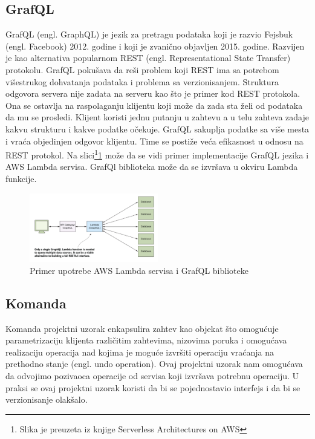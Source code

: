 \documentclass[12pt,oneside]{memoir}
\begin{document}
\subsection{GrafQL}

GrafQL (engl. GraphQL) je jezik za pretragu podataka koji je razvio Fejsbuk (engl. Facebook) 2012. godine i koji je zvanično objavljen 2015. godine\cite{gql}. Razvijen je kao alternativa popularnom REST (engl. Representational State Transfer) protokolu. GrafQL pokušava da reši problem koji REST ima sa potrebom višestrukog dohvatanja podataka i problema sa verzionisanjem. Struktura odgovora servera nije zadata na serveru kao što je primer kod REST protokola. Ona se ostavlja na raspolaganju klijentu koji može da zada sta želi od podataka da mu se prosledi. Klijent koristi jednu putanju u zahtevu a u telu zahteva zadaje kakvu strukturu i kakve podatke očekuje. GrafQL sakuplja podatke sa više mesta i vraća objedinjen odgovor klijentu. Time se postiže veća efikasnost u odnosu na REST protokol. Na slici\footnote{Slika je preuzeta iz knjige Serverless Architectures on AWS}\ref{fig:graphql} može da se vidi primer implementacije GrafQL jezika i AWS Lambda servisa. GrafQl biblioteka može da se izvršava u okviru Lambda funkcije. 

\begin{figure}[!ht]
  \centering
  \includegraphics[width=0.5\textwidth]{Slika 11.png}
  \caption{Primer upotrebe AWS Lambda servisa i GrafQL biblioteke}
  \label{fig:graphql}
\end{figure}

\subsection{Komanda}
Komanda projektni uzorak enkapsulira zahtev kao objekat što omogućuje parametrizaciju klijenta različitim zahtevima, nizovima poruka i omogućava realizaciju operacija nad kojima je moguće izvršiti operaciju vraćanja na prethodno stanje (engl. undo operation)\cite{cdp}. Ovaj projektni uzorak nam omogućava da odvojimo pozivaoca operacije od servisa koji izvršava potrebnu operaciju. U praksi se ovaj projektni uzorak koristi da bi se pojednostavio interfejs i da bi se verzionisanje olakšalo.
\end{document}
